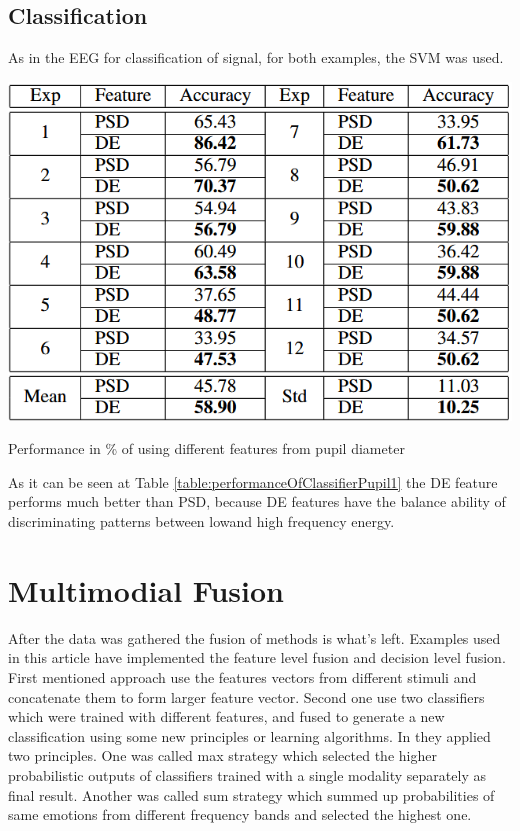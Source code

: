 \documentclass[10pt,journal,compsoc,twoside]{IEEEtran}
\newcommand{\Ref}[2]{#2 \ref{#1}}
\begin{document}
\subsection{Classification}
As in the EEG for classification of signal, for both examples, the SVM was used.
\begin{table}[ht]
	\centering
	\includegraphics[width=1.0\linewidth]{performanceOfClassifierPupil1}
	\caption{ Performance in \% of using different features from pupil diameter \cite{WeiLongBoNanBaoLiang2014}}
	\label{table:performanceOfClassifierPupil1}
\end{table}
As it can be seen at \Ref{table:performanceOfClassifierPupil1}{Table} the DE feature performs much better than PSD, because DE features have the balance ability of discriminating patterns between  lowand high frequency energy.
 \section{Multimodial Fusion} 
After the data was gathered the fusion of methods is what's left. Examples used in this article have implemented the feature level fusion and decision level fusion. 
First mentioned approach use the features vectors from different stimuli and concatenate them to form larger feature vector. Second one use two classifiers which were trained with different features, and fused to generate a new classification using some new principles or learning algorithms. In \cite{WeiLongBoNanBaoLiang2014} they applied two principles. One was called max strategy which selected the higher probabilistic outputs of classifiers trained with a single modality separately as final result. Another was called sum strategy which summed up probabilities of same emotions from different frequency bands and selected the highest one.
\end{document}
